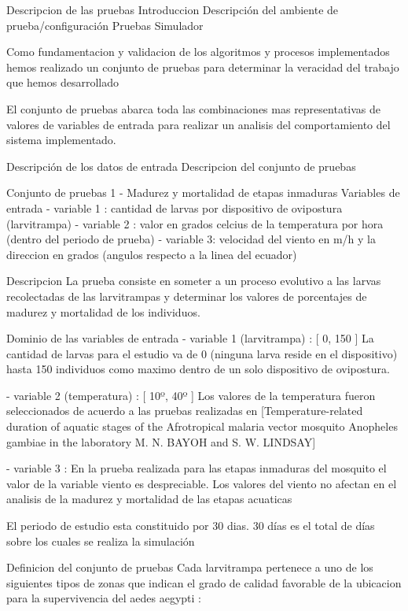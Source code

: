 Descripcion de las pruebas
Introduccion
Descripción del ambiente de prueba/configuración
Pruebas Simulador

Como fundamentacion y validacion de los algoritmos y procesos implementados
hemos realizado un conjunto de pruebas para determinar la veracidad del 
trabajo que hemos desarrollado

El conjunto de pruebas abarca toda las combinaciones mas representativas
de valores de variables de entrada para realizar un analisis del comportamiento 
del sistema implementado.

Descripción de los datos de entrada
Descripcion del conjunto de pruebas

Conjunto de pruebas 1 - Madurez y mortalidad de etapas inmaduras   
Variables de entrada
- variable 1 : cantidad de larvas por dispositivo de ovipostura (larvitrampa)
- variable 2 : valor en grados celcius de la temperatura por hora (dentro del periodo de prueba)
- variable 3: velocidad del viento en m/h y la direccion en grados (angulos respecto
a la linea del ecuador)

Descripcion
La prueba consiste en someter a un proceso evolutivo a las larvas 
recolectadas de las larvitrampas y determinar los valores de porcentajes 
de madurez y mortalidad de los individuos.

Dominio de las variables de entrada
- variable 1 (larvitrampa) : [ 0, 150 ]
La cantidad de larvas para el estudio va de 0 (ninguna larva reside en el 
dispositivo) hasta 150 individuos como maximo dentro de un solo dispositivo
de ovipostura.

- variable 2 (temperatura) :  [ 10º, 40º ]
Los valores de la temperatura fueron seleccionados de acuerdo a las pruebas realizadas en
[Temperature-related duration of aquatic stages of the Afrotropical 
malaria vector mosquito Anopheles gambiae in the laboratory M. N. BAYOH 
and S. W. LINDSAY]

- variable 3 : En la prueba realizada para las etapas inmaduras del 
mosquito el valor de la variable viento es despreciable. Los valores 
del viento no afectan en el analisis de la madurez y mortalidad 
de las etapas acuaticas

El periodo de estudio esta constituido por 30 dias. 30 días es el total
de días sobre los cuales se realiza la simulación

Definicion del conjunto de pruebas
Cada larvitrampa pertenece a uno de los siguientes tipos de zonas que 
indican el grado de calidad favorable de la ubicacion para la supervivencia
del aedes aegypti :

